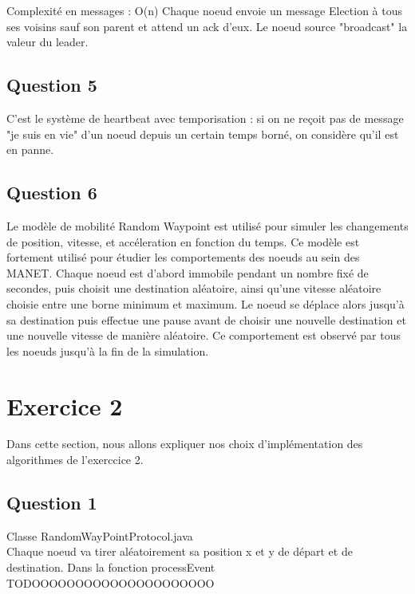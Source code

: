 \documentclass[paper=a4, fontsize=11pt]{article} %
\begin{document}
%
%
%			
%
%
%
%
Complexité en messages : O(n)
Chaque noeud envoie un message Election à tous ses voisins sauf son parent et attend un ack d'eux.
Le noeud source "broadcast" la valeur du leader.

 
\subsection{Question 5}
C'est le système de heartbeat avec temporisation : si on ne reçoit pas de message "je suis en vie" d'un noeud depuis un certain temps borné, on considère qu'il est en panne. 

\subsection{Question 6}

Le modèle de mobilité Random Waypoint est utilisé pour simuler les changements de position, vitesse, et accéleration en fonction du temps. Ce modèle est fortement utilisé
pour étudier les comportements des noeuds au sein des MANET. Chaque noeud est d'abord immobile pendant un nombre fixé de secondes, puis choisit une destination aléatoire, ainsi qu'une vitesse aléatoire choisie entre une borne
minimum et maximum. Le noeud se déplace alors jusqu'à sa destination puis effectue une pause avant de choisir une nouvelle destination et une nouvelle vitesse de manière aléatoire. Ce comportement est observé par tous les noeuds jusqu'à 
la fin de la simulation.

\newpage
\section{Exercice 2}
Dans cette section, nous allons expliquer nos choix d'implémentation des algorithmes de l'exerccice 2.

\subsection{Question 1}
Classe RandomWayPointProtocol.java \\
Chaque noeud va tirer aléatoirement sa position x et y de départ et de destination. 
Dans la fonction processEvent TODOOOOOOOOOOOOOOOOOOOOO
\end{document}
